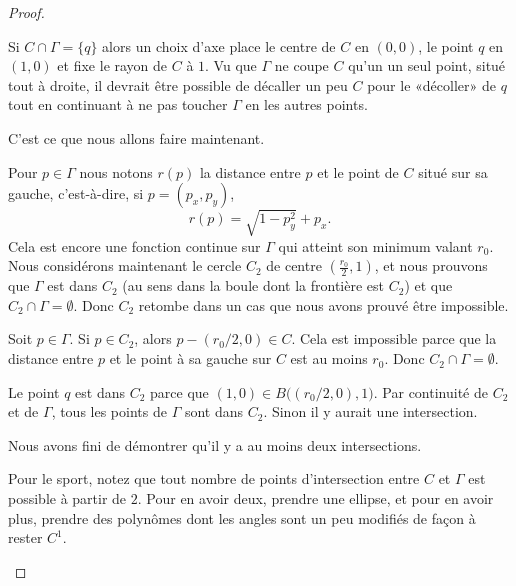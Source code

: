 \begin{proof}
\begin{subproof}
\begin{subproof}

			Si \( C\cap \Gamma=\{ q \}\) alors un choix d'axe place le centre de \( C\) en \( (0,0)\), le point \( q\) en \( (1,0)\) et fixe le rayon de \( C\) à \( 1\). Vu que \( \Gamma\) ne coupe \( C\) qu'un un seul point, situé tout à droite, il devrait être possible de décaller un peu \( C\) pour le «décoller» de \( q\) tout en continuant à ne pas toucher \( \Gamma\) en les autres points.

			C'est ce que nous allons faire maintenant.

			Pour \( p\in \Gamma\) nous notons \( r(p)\) la distance entre \( p\) et le point de \( C\) situé sur sa gauche, c'est-à-dire, si \( p=(p_x,p_y)\),
			\begin{equation}		\label{EQooCWRDooRzwqKi}
				r(p)=\sqrt{ 1-p_y^2 }+p_x.
			\end{equation}
			Cela est encore une fonction continue sur \( \Gamma\) qui atteint son minimum valant \( r_0\). Nous considérons maintenant le cercle \( C_2\) de centre \( (\frac{ r_0 }{ 2 },1)\), et nous prouvons que \( \Gamma\) est dans \( C_2\) (au sens dans la boule dont la frontière est \( C_2\)) et que \( C_2\cap\Gamma=\emptyset\). Donc \( C_2\) retombe dans un cas que nous avons prouvé être impossible.

			Soit \( p\in \Gamma\). Si \( p\in C_2\), alors \( p-(r_0/2,0)\in C\). Cela est impossible parce que la distance entre \( p\) et le point à sa gauche sur \( C\) est au moins \( r_0\). Donc \( C_2\cap \Gamma=\emptyset\).

			Le point \( q\) est dans \( C_2\) parce que \( (1,0)\in B\big( (r_0/2,0),1 \big)\). Par continuité de \( C_2\) et de \( \Gamma\), tous les points de \( \Gamma\) sont dans \( C_2\). Sinon il y aurait une intersection.

			Nous avons fini de démontrer qu'il y a au moins deux intersections.

			Pour le sport, notez que tout nombre de points d'intersection entre \( C\) et \( \Gamma\) est possible à partir de \( 2\). Pour en avoir deux, prendre une ellipse, et pour en avoir plus, prendre des polynômes dont les angles sont un peu modifiés de façon à rester \( C^1\).

		\end{subproof}



\end{subproof}
\end{proof}
